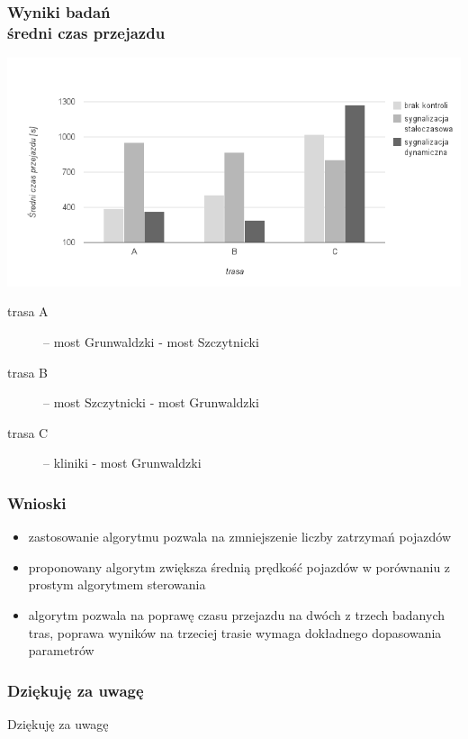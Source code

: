 \documentclass[17pt]{beamer}
\begin{document}
\begin{frame}[shrink=5]
  \frametitle{\vspace{10px}Wyniki badań\\\small{średni czas przejazdu}}
  \includegraphics[width=1.0\textwidth]{wyniki_3.png}\\
  \tiny{
  \begin{description}
  \item[trasa A] -- most Grunwaldzki - most Szczytnicki
  \item[trasa B] -- most Szczytnicki - most Grunwaldzki
  \item[trasa C] -- kliniki - most Grunwaldzki
  \end{description}
  }
\end{frame}

\begin{frame}
 \frametitle{\vspace{22px}Wnioski}
  \small{
  \begin{itemize}
    \item zastosowanie algorytmu pozwala na zmniejszenie liczby zatrzymań pojazdów
    \item proponowany algorytm zwiększa średnią prędkość pojazdów w porównaniu z prostym algorytmem sterowania
    \item algorytm pozwala na poprawę czasu przejazdu na dwóch z trzech badanych tras, poprawa wyników na trzeciej trasie wymaga dokładnego dopasowania parametrów
  \end{itemize}
  }
\end{frame}

\begin{frame}
 \frametitle{\vspace{22px}Dziękuję za uwagę}
  \begin{center}Dziękuję za uwagę\end{center}
\end{frame}
\end{document}
